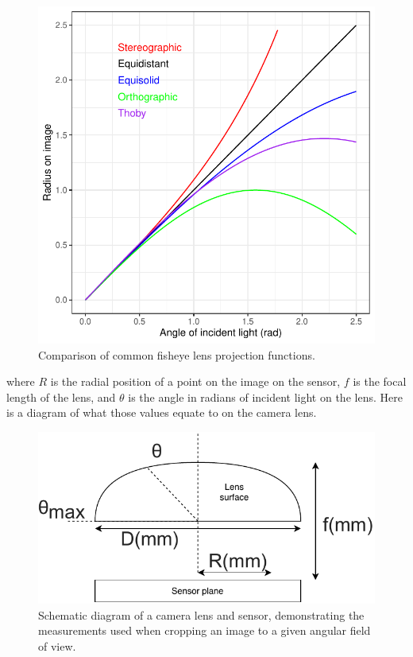 \documentclass[11pt,a4paper]{article}
\begin{document}
\begin{figure}[H]
	\includegraphics[width=\textwidth]{lens_proj}
	\caption{Comparison of common fisheye lens projection functions.}
	\label{lens_proj}
\end{figure}

where $R$ is the radial position of a point on the image on the sensor, $f$ is the focal length of the lens, and $\theta$ is the angle in radians of incident light on the lens. Here is a diagram of what those values equate to on the camera lens.

\begin{figure}[H]
\centering
	\includegraphics[width=\textwidth]{fov_diagram.drawio}
	\caption{Schematic diagram of a camera lens and sensor, demonstrating the measurements used when cropping an image to a given angular field of view.}
	\label{fov_diagram}
\end{figure}
\end{document}
